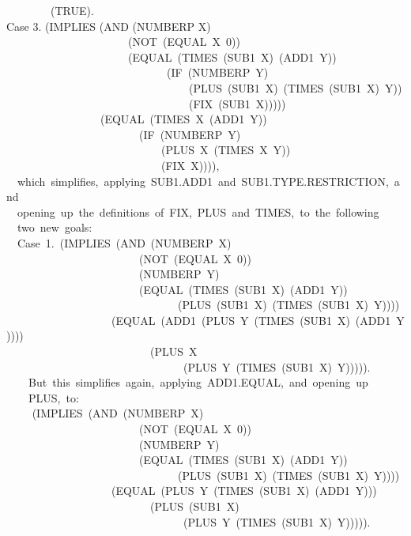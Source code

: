 \documentclass[10pt]{book}
\newenvironment{pubasis}{\begin{flushleft}}{\end{flushleft}}
\begin{document}
\begin{pubasis}
~~~~~~~~(TRUE).\\

Case 3.	(IMPLIES (AND (NUMBERP X)\\
~~~~~~~~~~~~~~~~~~~~~~(NOT~(EQUAL~X~0))\\
~~~~~~~~~~~~~~~~~~~~~~(EQUAL~(TIMES~(SUB1~X)~(ADD1~Y))\\
~~~~~~~~~~~~~~~~~~~~~~~~~~~~~(IF~(NUMBERP~Y)\\
~~~~~~~~~~~~~~~~~~~~~~~~~~~~~~~~~(PLUS~(SUB1~X)~(TIMES~(SUB1~X)~Y))\\
~~~~~~~~~~~~~~~~~~~~~~~~~~~~~~~~~(FIX~(SUB1~X)))))\\
~~~~~~~~~~~~~~~~~(EQUAL~(TIMES~X~(ADD1~Y))\\
~~~~~~~~~~~~~~~~~~~~~~~~(IF~(NUMBERP~Y)\\
~~~~~~~~~~~~~~~~~~~~~~~~~~~~(PLUS~X~(TIMES~X~Y))\\
~~~~~~~~~~~~~~~~~~~~~~~~~~~~(FIX~X)))),\\

~~which~simplifies,~applying~SUB1.ADD1~and~SUB1.TYPE.RESTRICTION,~and\\
~~opening~up~the~definitions~of~FIX,~PLUS~and~TIMES,~to~the~following\\
~~two~new~goals:\\

~~Case~1.~(IMPLIES~(AND~(NUMBERP~X)\\
~~~~~~~~~~~~~~~~~~~~~~~~(NOT~(EQUAL~X~0))\\
~~~~~~~~~~~~~~~~~~~~~~~~(NUMBERP~Y)\\
~~~~~~~~~~~~~~~~~~~~~~~~(EQUAL~(TIMES~(SUB1~X)~(ADD1~Y))\\
~~~~~~~~~~~~~~~~~~~~~~~~~~~~~~~(PLUS~(SUB1~X)~(TIMES~(SUB1~X)~Y))))\\
~~~~~~~~~~~~~~~~~~~(EQUAL~(ADD1~(PLUS~Y~(TIMES~(SUB1~X)~(ADD1~Y))))\\
~~~~~~~~~~~~~~~~~~~~~~~~~~(PLUS~X\\
~~~~~~~~~~~~~~~~~~~~~~~~~~~~~~~~(PLUS~Y~(TIMES~(SUB1~X)~Y))))).\\

~~~~But~this~simplifies~again,~applying~ADD1.EQUAL,~and~opening~up\\
~~~~PLUS,~to:\\

~~	~~(IMPLIES~(AND~(NUMBERP~X)\\
~~~~~~~~~~~~~~~~~~~~~~~~(NOT~(EQUAL~X~0))\\
~~~~~~~~~~~~~~~~~~~~~~~~(NUMBERP~Y)\\
~~~~~~~~~~~~~~~~~~~~~~~~(EQUAL~(TIMES~(SUB1~X)~(ADD1~Y))\\
~~~~~~~~~~~~~~~~~~~~~~~~~~~~~~~(PLUS~(SUB1~X)~(TIMES~(SUB1~X)~Y))))\\
~~~~~~~~~~~~~~~~~~~(EQUAL~(PLUS~Y~(TIMES~(SUB1~X)~(ADD1~Y)))\\
~~~~~~~~~~~~~~~~~~~~~~~~~~(PLUS~(SUB1~X)\\
~~~~~~~~~~~~~~~~~~~~~~~~~~~~~~~~(PLUS~Y~(TIMES~(SUB1~X)~Y))))).\\


\end{pubasis}
\end{document}
